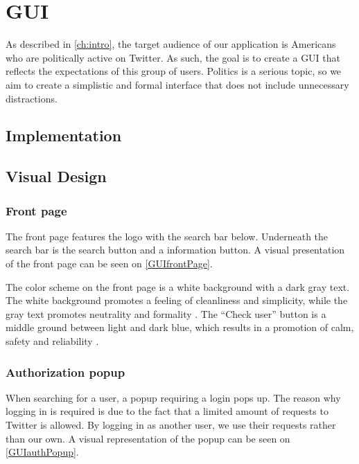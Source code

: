 \chapter{GUI} \label{GUI}
As described in \autoref{ch:intro}, the target audience of our application is
Americans who are politically active on Twitter. As such, the goal is to create
a GUI that reflects the expectations of this group of users. Politics is a serious
topic, so we aim to create a simplistic and formal interface that does not
include unnecessary distractions.

\section{Implementation}

\section{Visual Design}

\subsection{Front page}
The front page features the logo with the search bar below. Underneath the
search bar is the search button and a information button. A visual presentation
of the front page can be seen on \autoref{GUIfrontPage}.

{}

The color scheme on the front page is a white background with a dark gray text.
The white background promotes a feeling of cleanliness and simplicity, while the
gray text promotes neutrality and formality \citep[p. 63 \& 64]{WebUI}. 
The ``Check user'' button is a middle ground between light and dark blue, which
results in a promotion of calm, safety and reliability \citep[p. 61]{WebUI}.

\subsection{Authorization popup}

When searching for a user, a popup requiring a login pops up. The reason why
logging in is required is due to the fact that a limited amount of requests to
Twitter is allowed. By logging in as another user, we use their requests rather
than our own. A visual representation of the popup can be seen on
\autoref{GUIauthPopup}.

